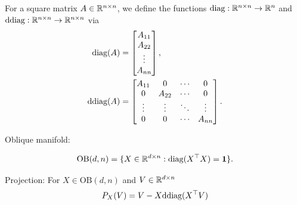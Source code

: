 For a square matrix $A\in\mathbb{R}^{n\times n}$, we define the functions 
$\text{diag}:\mathbb{R}^{n\times n}\to\mathbb{R}^{n}$ and $\text{ddiag}:\mathbb{R}^{n\times n}\to\mathbb{R}^{n\times n}$ via
\begin{align}
    \text{diag}(A) &= \begin{bmatrix}
        A_{11} \\ A_{22} \\ \vdots \\ A_{nn}
    \end{bmatrix},
    \\
    \text{ddiag}(A) &= \begin{bmatrix}
        A_{11} & 0 & \cdots & 0 \\
        0 & A_{22} & \cdots & 0 \\
        \vdots & \vdots & \ddots & \vdots \\
        0 & 0 & \cdots & A_{nn}
    \end{bmatrix}.
\end{align}

Oblique manifold:

\begin{equation}
    \text{OB}(d,n) = \{X\in\mathbb{R}^{d\times n} : \text{diag}(X^\top X) = \mathbf{1}\}.
\end{equation}

Projection:
For $X\in\text{OB}(d,n)$ and $V\in\mathbb{R}^{d\times n}$
\begin{equation}
    P_X(V) = V - X \text{ddiag}(X^\top V)
\end{equation}